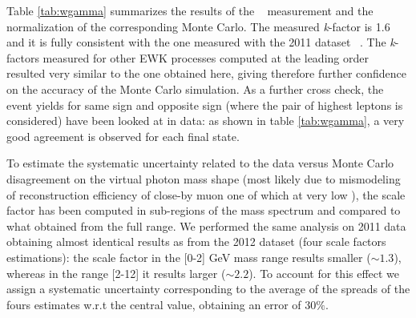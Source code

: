 Table \ref{tab:wgamma} summarizes the results of the \Wgstar~
measurement and the normalization of the corresponding Monte
Carlo. The measured {\em k}-factor is 1.6 and it is fully consistent with
the one measured with the 2011 dataset ~\cite{HWW2011}.
The {\em k}-factors measured for other EWK processes computed at the leading
order resulted very similar to the one obtained here, giving therefore 
further confidence on the accuracy of the Monte Carlo simulation.  
As a further cross check, the event yields for same sign and opposite sign 
(where the pair of highest \pt leptons is considered) have been looked at in data:
as shown in table \ref{tab:wgamma}, a very good agreement is observed for each final 
state.

To estimate the systematic uncertainty related to the data versus Monte Carlo 
disagreement on the virtual photon mass shape (most likely due to mismodeling
of reconstruction efficiency of close-by muon one of which at very low \pt),
the scale factor has been computed in sub-regions of the mass spectrum and compared to what
obtained from the full range. 
We performed the same analysis on 2011 data obtaining almost identical results as
from the 2012 dataset (four scale factors estimations): 
the scale factor in the [0-2] GeV mass range results smaller ($\sim1.3$),
whereas in the range [2-12] it results larger ($\sim2.2$).
To account for this effect we assign a systematic uncertainty corresponding to
the average of the spreads of the fours estimates w.r.t the central value, obtaining
an error of $30\%$. 


